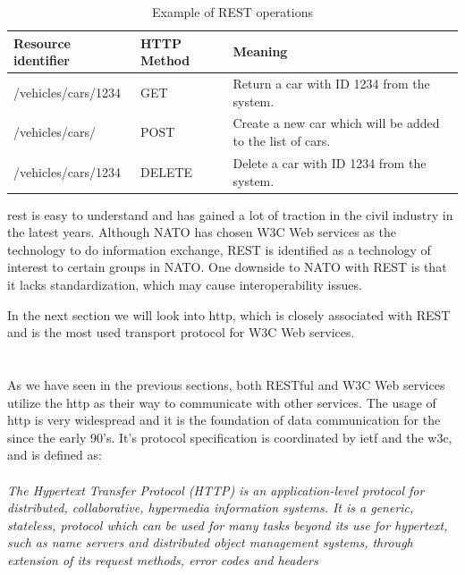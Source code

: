  \begin{table}[h]
 \begin{tabularx}{\textwidth}{| X | X | X |}
 \hline
   \textbf{Resource identifier} & \textbf{HTTP Method}  & \textbf{Meaning}\\ \hline
   /vehicles/cars/1234 & GET & Return a car with ID 1234 from the system. \\ \hline
   /vehicles/cars/ & POST & Create a new car which will be added to the list of cars. \\ \hline
   /vehicles/cars/1234 & DELETE & Delete a car with ID 1234 from the system. \\ \hline
 \end{tabularx}
 \caption{Example of REST operations}
 \label{table-rest}
 \end{table}

 \gls{rest} is easy to understand and has gained a lot of traction in the civil
 industry in the latest years. Although NATO has chosen W3C Web services as the
 technology to do information exchange, REST is identified as a technology of
 interest to certain groups in
 NATO\cite{johnsen-bloebaum-recommendations-web-services-tactical-domain}. One
 downside to NATO with REST is that it lacks standardization, which may cause
 interoperability issues.

 In the next section we will look into \gls{http}, which is closely associated
 with REST and is the most used transport protocol for W3C Web services.

\section{}

As we have seen in the previous sections, both RESTful and W3C Web services
utilize the \gls{http} as their way to communicate with other services. The
usage of \gls{http} is very widespread and it is the foundation of data
communication for the  since the early 90's. It's protocol
specification is coordinated by \gls{ietf} and the \gls{w3c}, and is defined
as\cite{rfc-2616}:

\paragraph{}
\textit{
    The Hypertext Transfer Protocol (HTTP) is an application-level
    protocol for distributed, collaborative, hypermedia information
    systems. It is a generic, stateless, protocol which can be used for
    many tasks beyond its use for hypertext, such as name servers and
    distributed object management systems, through extension of its
    request methods, error codes and headers
}

